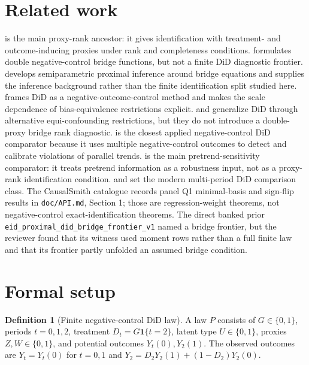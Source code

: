 \documentclass[11pt]{article}
\newcommand{\one}{\mathbf{1}}
\theoremstyle{definition}
\newtheorem{definition}{Definition}
\theoremstyle{plain}
\theoremstyle{remark}
\begin{document}
\section{Related work}
\citet{MiaoGengTchetgen2018} is the main proxy-rank ancestor: it gives
identification with treatment- and outcome-inducing proxies under rank and
completeness conditions. \citet{MiaoShiLiTchetgen2024} formulates double
negative-control bridge functions, but not a finite DiD diagnostic frontier.
\citet{CuiPuShiMiaoTchetgen2024} develops semiparametric proximal inference
around bridge equations and supplies the inference background rather than the
finite identification split studied here. \citet{SoferRichardsonColicinoSchwartzTchetgen2016}
frames DiD as a negative-outcome-control method and makes the scale dependence
of bias-equivalence restrictions explicit. \citet{RichardsonYeTchetgen2023}
and \citet{TchetgenParkRichardson2024} generalize DiD through alternative
equi-confounding restrictions, but they do not introduce a double-proxy bridge
rank diagnostic. \citet{ZhangZhangWangEtAl2025} is the closest applied
negative-control DiD comparator because it uses multiple negative-control
outcomes to detect and calibrate violations of parallel trends. \citet{RambachanRoth2023}
is the main pretrend-sensitivity comparator: it treats pretrend information as
a robustness input, not as a proxy-rank identification condition. \citet{CallawaySantAnna2021}
and \citet{SunAbraham2021} set the modern multi-period DiD comparison class.
The CausalSmith catalogue records panel Q1 minimal-basis and sign-flip results
in \texttt{doc/API.md}, Section 1; those are regression-weight theorems, not
negative-control exact-identification theorems. The direct banked prior
\texttt{eid\_proximal\_did\_bridge\_frontier\_v1} named a bridge frontier, but
the reviewer found that its witness used moment rows rather than a full finite
law and that its frontier partly unfolded an assumed bridge condition.

\section{Formal setup}
\begin{definition}[Finite negative-control DiD law]
A law $P$ consists of $G\in\{0,1\}$, periods $t=0,1,2$, treatment
$D_t=G\one\{t=2\}$, latent type $U\in\{0,1\}$, proxies $Z,W\in\{0,1\}$,
and potential outcomes $Y_t(0),Y_2(1)$. The observed outcomes are
$Y_t=Y_t(0)$ for $t=0,1$ and
$Y_2=D_2Y_2(1)+(1-D_2)Y_2(0)$.
\end{definition}
\end{document}
